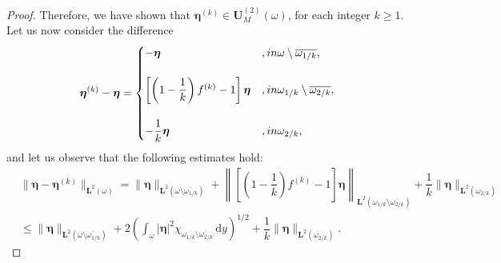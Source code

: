 \documentclass{amsart}
\def\dd{\, \mathrm{d}}
\begin{document}
\begin{proof}
	Therefore, we have shown that $\bm{\eta}^{(k)} \in \bm{U}_M^{(2)}(\omega)$, for each integer $k\ge 1$. Let us now consider the difference
	\begin{equation*}
		\bm{\eta}^{(k)}-\bm{\eta}=
		\begin{cases}
			-\bm{\eta}&, \textup{ in }\omega\setminus\overline{\omega_{1/k}},\\
			\\
			\left[\left(1-\dfrac{1}{k}\right)f^{(k)}-1\right]\bm{\eta}&, \textup{ in }\omega_{1/k}\setminus\overline{\omega_{2/k}},\\
			\\
			-\dfrac{1}{k}\bm{\eta}&, \textup{ in }\omega_{2/k},
		\end{cases}
	\end{equation*}
	and let us observe that the following estimates hold:
	\begin{equation*}
		\begin{aligned}
			&\|\bm{\eta}-\bm{\eta}^{(k)}\|_{\bm{L}^2(\omega)}=\|\bm{\eta}\|_{\bm{L}^2(\omega\setminus\overline{\omega_{1/k}})}+\left\|\left[\left(1-\dfrac{1}{k}\right)f^{(k)}-1\right]\bm{\eta}\right\|_{\bm{L}^2(\omega_{1/k}\setminus\overline{\omega_{2/k}})}+\dfrac{1}{k}\|\bm{\eta}\|_{\bm{L}^2(\omega_{2/k})}\\
			&\le \|\bm{\eta}\|_{\bm{L}^2(\omega\setminus\overline{\omega_{1/k}})}+2\left(\int_{\omega}|\bm{\eta}|^2 \chi_{\omega_{1/k}\setminus\overline{\omega_{2/k}}}\dd y\right)^{1/2} +\dfrac{1}{k}\|\bm{\eta}\|_{\bm{L}^2(\omega_{2/k})}.
		\end{aligned}
	\end{equation*}
	

\end{proof}
\end{document}
